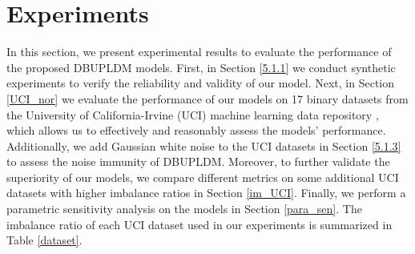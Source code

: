 \documentclass[a4paper]{cas-sc}
\begin{document}
\section{Experiments} \label{5}



In this section, we present experimental results to evaluate the performance of the proposed DBUPLDM models. First, in Section \ref{5.1.1} we conduct synthetic experiments to verify the reliability and validity of our model. Next, in Section \ref{UCI_nor} we evaluate the performance of our models on 17 binary datasets from the University of California-Irvine (UCI) machine learning data repository \citep{asuncion2007uci}, which allows us to effectively and reasonably assess the models' performance. Additionally, we add Gaussian white noise to the UCI datasets in Section \ref{5.1.3} to assess the noise immunity of DBUPLDM. Moreover, to further validate the superiority of our models, we compare different metrics on some additional UCI datasets with higher imbalance ratios in Section \ref{im_UCI}. Finally, we perform a parametric sensitivity analysis on the models in Section \ref{para_sen}. The imbalance ratio of each UCI dataset used in our experiments is summarized in Table \ref{dataset}.
\end{document}
